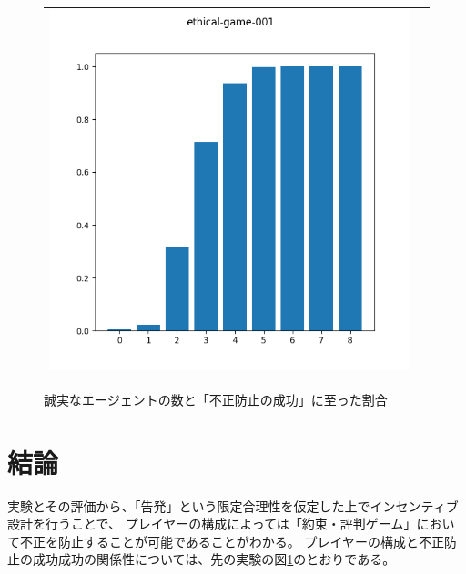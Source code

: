 \begin{figure}[h]
  \begin{tabular}{cc}
    \begin{minipage}[t]{1\hsize}
      \centering
      \includegraphics[keepaspectratio, width=1\linewidth]{./06_ethical-commerce-game/ethical-game-001.png}
      \caption{誠実なエージェントの数と「不正防止の成功」に至った割合}
      \label{ethical-game-001}
    \end{minipage}
  \end{tabular}
\end{figure}

\section{結論}
実験とその評価から、「告発」という限定合理性を仮定した上でインセンティブ設計を行うことで、
プレイヤーの構成によっては「約束・評判ゲーム」において不正を防止することが可能であることがわかる。
プレイヤーの構成と不正防止の成功成功の関係性については、先の実験の図\ref{ethical-game-001}のとおりである。
